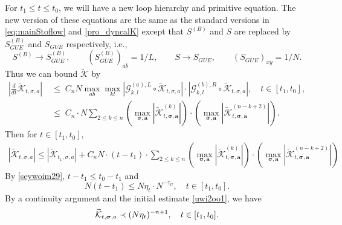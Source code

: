 \documentclass[10pt,reqno]{article}
\theoremstyle{plain} %
\theoremstyle{remark}
\numberwithin{equation}{section}
\begin{document}
 
For $  t_1\le t\le t_0$, we will have a new  loop hierarchy and primitive equation. The new version of these equations are the same as the standard versions in  \eqref{eq:mainStoflow} and \eqref{pro_dyncalK} except that  $S^{(B)}$ and $S$ are replaced by $S^{(B)}_{GUE}$ and $S_{GUE}$ respectively, i.e., 
$$
S^{(B)}\to S^{(B)}_{GUE},\quad \quad \left(S^{(B)}_{GUE}\right)_{ab}=1/L,\quad  \quad S \to S _{GUE},\quad \quad \left(S _{GUE}\right)_{xy}=1/N.
$$ 
Thus we can bound  $\mathcal{\widetilde{K}}$ by 
\begin{align}
\left|\frac{d}{d t} \mathcal{\widetilde{K}}_{t, \sigma, a}\right|&\;\le\;  C_nN\max_{ab}\max_{kl}   \left|\mathcal{G}_{k, l}^{(a), L} \circ \mathcal{\widetilde{K}}_{t, \sigma, a}\right|\cdot   \left|\mathcal{G}_{k, l}^{(b), R} \circ \mathcal{\widetilde{K}}_{t, \sigma, a}\right|,\quad t\in [t_1,t_0], 
\\ &
\;\le\; C_n\cdot   N \sum_{2\le k\le n}\left(\max_{\boldsymbol{\sigma}, \textbf{a}}
\left|\mathcal{\widetilde{K}}^{(k)}_{t, \boldsymbol{\sigma}, \textbf{a}}\right|\right)\cdot \left(\max_{\boldsymbol{\sigma}, \textbf{a}}
\left|\mathcal{\widetilde{K}}^{(n-k+2)}_{t, \boldsymbol{\sigma}, \textbf{a}}\right|\right). 
\end{align}
Then for $t\in [t_1,t_0]$, 
\begin{align}
|\mathcal{\widetilde{K}}_{t, \sigma, a}|
\le |\mathcal{\widetilde{K}}_{t_1, \sigma, a}|+C_n N\cdot(t -t_1)
\cdot \sum_{2\le k\le n}\left(\max_{\boldsymbol{\sigma}, \textbf{a}}
\left|\mathcal{\widetilde{K}}^{(k)}_{t, \boldsymbol{\sigma}, \textbf{a}}\right|\right)\cdot \left(\max_{\boldsymbol{\sigma}, \textbf{a}}
\left|\mathcal{\widetilde{K}}^{(n-k+2)}_{t, \boldsymbol{\sigma}, \textbf{a}}\right|\right)
\end{align}
By \eqref{seywoim29},  $t-t_1\le t_0-t_1$ and  
$$
N(t-t_1) \le  N\eta_{t }\cdot N^{-\tau_U} , \quad t\in [t_1,t_0].
$$  
By a continuity argument and the initial estimate  \eqref{uwi2oo1}, we have 
\begin{equation}\label{45} 
 {\cal \widetilde{K}}_{t , \boldsymbol{\sigma}, \textbf{a}}  \prec (N\eta_{t })^{-n+1}, \quad t\in [t_1,t_0]. 
\end{equation}
  
\end{document}

